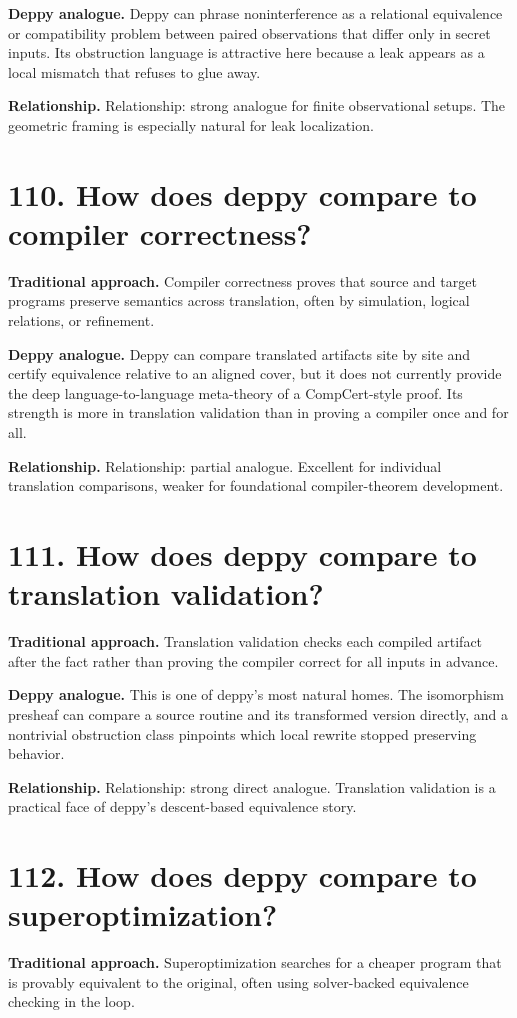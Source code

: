 \documentclass[11pt,openany]{book}
\begin{document}
\textbf{Deppy analogue.} Deppy can phrase noninterference as a relational equivalence or compatibility problem between paired observations that differ only in secret inputs. Its obstruction language is attractive here because a leak appears as a local mismatch that refuses to glue away.

\textbf{Relationship.} Relationship: strong analogue for finite observational setups. The geometric framing is especially natural for leak localization.

\section*{110. How does deppy compare to compiler correctness?}
\textbf{Traditional approach.} Compiler correctness proves that source and target programs preserve semantics across translation, often by simulation, logical relations, or refinement.

\textbf{Deppy analogue.} Deppy can compare translated artifacts site by site and certify equivalence relative to an aligned cover, but it does not currently provide the deep language-to-language meta-theory of a CompCert-style proof. Its strength is more in translation validation than in proving a compiler once and for all.

\textbf{Relationship.} Relationship: partial analogue. Excellent for individual translation comparisons, weaker for foundational compiler-theorem development.

\section*{111. How does deppy compare to translation validation?}
\textbf{Traditional approach.} Translation validation checks each compiled artifact after the fact rather than proving the compiler correct for all inputs in advance.

\textbf{Deppy analogue.} This is one of deppy's most natural homes. The isomorphism presheaf can compare a source routine and its transformed version directly, and a nontrivial obstruction class pinpoints which local rewrite stopped preserving behavior.

\textbf{Relationship.} Relationship: strong direct analogue. Translation validation is a practical face of deppy's descent-based equivalence story.

\section*{112. How does deppy compare to superoptimization?}
\textbf{Traditional approach.} Superoptimization searches for a cheaper program that is provably equivalent to the original, often using solver-backed equivalence checking in the loop.
\end{document}
